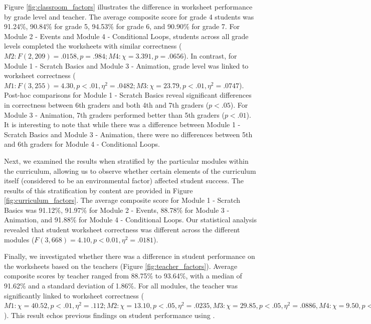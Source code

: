 {Figure \ref{fig:classroom_factors} illustrates the difference in \ts{} worksheet performance by grade level and teacher. The average \ts{} composite score for grade 4 students was 91.24\%, 90.84\% for grade 5, 94.53\% for grade 6, and 90.90\% for grade 7. For Module 2 - Events and Module 4 - Conditional Loops, students across all grade levels completed the worksheets with similar correctness (\begin{math}M2: F(2,209)=.0158, p=.984; M4:\chi=3.391, p=.0656\end{math}). In contrast, for Module 1 - Scratch Basics and Module 3 - Animation, grade level was linked to worksheet correctness (\begin{math}M1: F(3, 255)=4.30, p<.01, \eta^2=.0482; M3:\chi=23.79, p<.01, \eta^2=.0747\end{math}). Post-hoc comparisons for Module 1 - Scratch Basics reveal significant differences in correctness between 6th graders and both 4th and 7th graders (\begin{math}p<.05\end{math}). For Module 3 - Animation, 7th graders performed better than 5th graders (\begin{math}p<.01\end{math}). It is interesting to note that while there was a difference between Module 1 - Scratch Basics and Module 3 - Animation, there were no differences between 5th and 6th graders for Module 4 - Conditional Loops.

Next, we examined the results when stratified by the particular modules within the curriculum, allowing us to observe whether certain elements of the curriculum itself (considered to be an environmental factor) affected student success. The results of this stratification by content are provided in Figure \ref{fig:curriculum_factors}. The average composite score for Module 1 - Scratch Basics was 91.12\%, 91.97\% for Module 2 - Events, 88.78\% for Module 3 - Animation, and 91.88\% for Module 4 - Conditional Loops. Our statistical analysis revealed that student worksheet correctness was different across the different modules (\begin{math}F(3,668)=4.10, p<0.01, \eta^2=.0181\end{math}).

Finally, we investigated whether there was a difference in student performance on the worksheets based on the teachers (Figure \ref{fig:teacher_factors}). Average composite scores by teacher ranged from 88.75\% to 93.64\%, with a median of 91.62\% and a standard deviation of 1.86\%. For all modules, the teacher was significantly linked to worksheet correctness (\begin{math}M1: \chi=40.52, p<.01, \eta^2=.112; M2: \chi=13.10, p<.05, \eta^2=.0235, M3: \chi=29.85, p<.05, \eta^2=.0886, M4: \chi=9.50, p<.01, \eta^2=.0247\end{math}). This result echos previous findings on student performance using \ts \cite{franklin2020analysis}.

}
